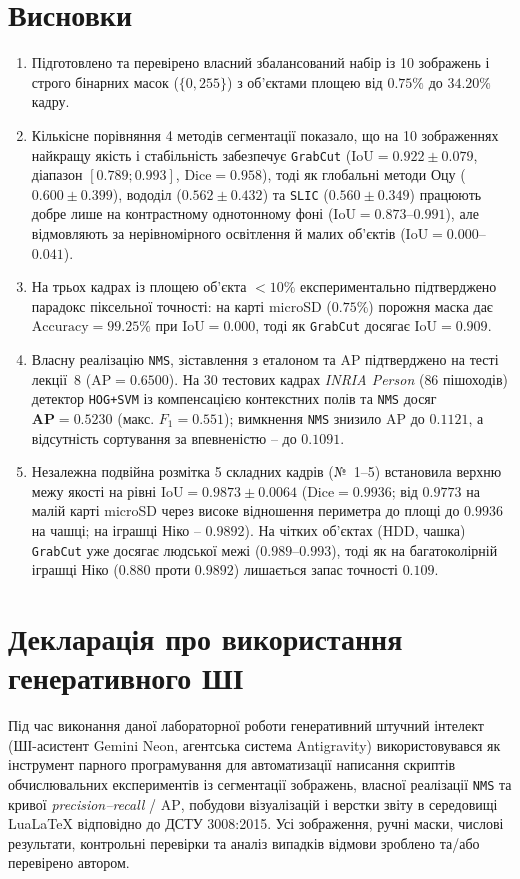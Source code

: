 \documentclass[14pt, a4paper]{extarticle}
\begin{document}
\section{Висновки}
\begin{enumerate}
    \item Підготовлено та перевірено власний збалансований набір із 10 зображень і строго бінарних масок ($\{0, 255\}$) з об'єктами площею від $0.75\%$ до $34.20\%$ кадру.
    \item Кількісне порівняння 4 методів сегментації показало, що на 10 зображеннях найкращу якість і стабільність забезпечує \texttt{GrabCut} ($\text{IoU} = \mathbf{0.922 \pm 0.079}$, діапазон $[0.789; 0.993]$, $\text{Dice} = 0.958$), тоді як глобальні методи Оцу ($0.600 \pm 0.399$), вододіл ($0.562 \pm 0.432$) та \texttt{SLIC} ($0.560 \pm 0.349$) працюють добре лише на контрастному однотонному фоні ($\text{IoU} = 0.873$--$0.991$), але відмовляють за нерівномірного освітлення й малих об'єктів ($\text{IoU} = 0.000$--$0.041$).
    \item На трьох кадрах із площею об'єкта $<10\%$ експериментально підтверджено парадокс піксельної точності: на карті microSD ($0.75\%$) порожня маска дає $\text{Accuracy} = \mathbf{99.25\%}$ при $\text{IoU} = \mathbf{0.000}$, тоді як \texttt{GrabCut} досягає $\text{IoU} = 0.909$.
    \item Власну реалізацію \texttt{NMS}, зіставлення з еталоном та $\text{AP}$ підтверджено на тесті лекції~8 ($\text{AP} = \mathbf{0.6500}$). На 30 тестових кадрах \emph{INRIA Person} ($86$ пішоходів) детектор \texttt{HOG+SVM} із компенсацією контекстних полів та \texttt{NMS} досяг $\mathbf{\text{AP} = 0.5230}$ (макс. $F_1 = 0.551$); вимкнення \texttt{NMS} знизило $\text{AP}$ до $0.1121$, а відсутність сортування за впевненістю -- до $0.1091$.
    \item Незалежна подвійна розмітка 5 складних кадрів (№~1--5) встановила верхню межу якості на рівні $\text{IoU} = \mathbf{0.9873 \pm 0.0064}$ ($\text{Dice} = 0.9936$; від $0.9773$ на малій карті microSD через високе відношення периметра до площі до $0.9936$ на чашці; на іграшці Ніко -- $0.9892$). На чітких об'єктах (HDD, чашка) \texttt{GrabCut} уже досягає людської межі ($0.989$--$0.993$), тоді як на багатоколірній іграшці Ніко ($0.880$ проти $0.9892$) лишається запас точності $0.109$.
\end{enumerate}

\section{Декларація про використання генеративного ШІ}
Під час виконання даної лабораторної роботи генеративний штучний інтелект (ШІ-асистент Gemini Neon, агентська система Antigravity) використовувався як інструмент парного програмування для автоматизації написання скриптів обчислювальних експериментів із сегментації зображень, власної реалізації \texttt{NMS} та кривої \emph{precision--recall} / $\text{AP}$, побудови візуалізацій і верстки звіту в середовищі LuaLaTeX відповідно до ДСТУ 3008:2015. Усі зображення, ручні маски, числові результати, контрольні перевірки та аналіз випадків відмови зроблено та/або перевірено автором.
\end{document}
